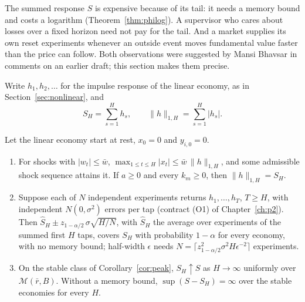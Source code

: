The summed response $S$ is expensive because of its tail: it needs a memory bound and costs a logarithm (Theorem~\ref{thm:philog}). A supervisor who cares about losses over a fixed horizon need not pay for the tail. And a market supplies its own reset experiments whenever an outside event moves fundamental value faster than the price can follow. Both observations were suggested by Mansi Bhavsar in comments on an earlier draft; this section makes them precise.

Write $h_1,h_2,\dots$ for the impulse response of the linear economy, as in Section~\ref{sec:nonlinear}, and
\[
S_H=\sum_{s=1}^{H}h_s,\qquad \|h\|_{1,H}=\sum_{s=1}^{H}|h_s| .
\]

\begin{proposition}\label{prop:horizon}
Let the linear economy start at rest, $x_0=0$ and $y_{i,0}=0$.
\begin{enumerate}[label=(\roman*)]
\item For shocks with $|w_t|\le\bar w$, $\max_{1\le t\le H}|x_t|\le\bar w\,\|h\|_{1,H}$, and some admissible shock sequence attains it. If $a\ge0$ and every $k_m\ge0$, then $\|h\|_{1,H}=S_H$.
\item Suppose each of $N$ independent experiments returns $h_1,\dots,h_T$, $T\ge H$, with independent $N(0,\sigma^2)$ errors per tap (contract (O1) of Chapter~\ref{ch:p2}). Then $\hat S_H\pm z_{1-\alpha/2}\,\sigma\sqrt{H/N}$, with $\hat S_H$ the average over experiments of the summed first $H$ taps, covers $S_H$ with probability $1-\alpha$ for every economy, with no memory bound; half-width $\epsilon$ needs $N=\lceil z_{1-\alpha/2}^2\sigma^2H\epsilon^{-2}\rceil$ experiments.
\item On the stable class of Corollary~\ref{cor:peak}, $S_H\uparrow S$ as $H\to\infty$ uniformly over $\mathcal M(\bar r,B)$. Without a memory bound, $\sup(S-S_H)=\infty$ over the stable economies for every $H$.
\end{enumerate}
\hfill\Proved
\end{proposition}

